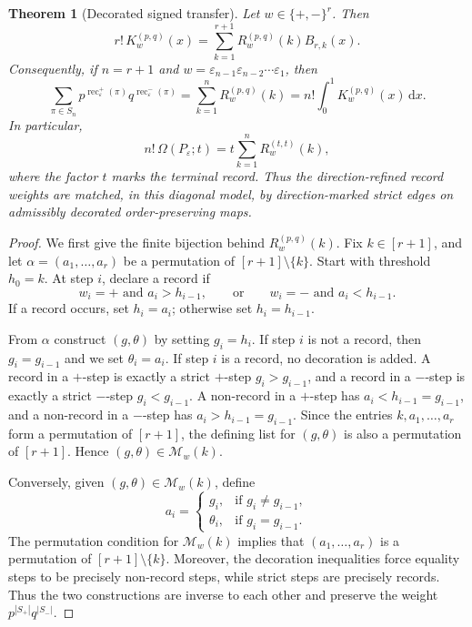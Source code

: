 \documentclass[11pt,letterpaper,reqno]{amsart}
\newtheorem{theorem}{Theorem}[section]
\theoremstyle{definition}
\DeclareMathOperator{\rec}{rec}
\newcommand{\dd}{\,\mathrm{d}}
\newcommand{\eps}{\varepsilon}
\begin{document}
\begin{theorem}[Decorated signed transfer]
\label{thm:decorated-signed-transfer}
Let \(w\in\{+,-\}^r\).  Then
\[
r!\,K_w^{(p,q)}(x)
=
\sum_{k=1}^{r+1}R_w^{(p,q)}(k)B_{r,k}(x).
\]
Consequently, if \(n=r+1\) and
\(w=\eps_{n-1}\eps_{n-2}\cdots\eps_1\), then
\[
\sum_{\pi\in S_n}
p^{\rec_\eps^+(\pi)}q^{\rec_\eps^-(\pi)}
=
\sum_{k=1}^{n}R_w^{(p,q)}(k)
=
n!\int_0^1K_w^{(p,q)}(x)\dd x.
\]
In particular,
\[
n!\,\Omega(P_\eps;t)
=
t\sum_{k=1}^{n}R_w^{(t,t)}(k),
\]
where the factor \(t\) marks the terminal record.  Thus the
direction-refined record weights are matched, in this diagonal model, by
direction-marked strict edges on admissibly decorated order-preserving maps.
\end{theorem}

\begin{proof}
We first give the finite bijection behind \(R_w^{(p,q)}(k)\).  Fix
\(k\in[r+1]\), and let $\alpha=(a_1,\ldots,a_r)$ be a permutation of \([r+1]\setminus\{k\}\).  Start with threshold
\(h_0=k\).  At step \(i\), declare a record if
\[
w_i=+\text{ and }a_i>h_{i-1},
\qquad\text{or}\qquad
w_i=-\text{ and }a_i<h_{i-1}.
\]
If a record occurs, set \(h_i=a_i\); otherwise set \(h_i=h_{i-1}\).

From \(\alpha\) construct \((g,\theta)\) by setting \(g_i=h_i\).  If step
\(i\) is not a record, then \(g_i=g_{i-1}\) and we set $\theta_i=a_i$. If step \(i\) is a record, no decoration is added.  A record in a \(+\)-step
is exactly a strict \(+\)-step \(g_i>g_{i-1}\), and a record in a \(-\)-step
is exactly a strict \(-\)-step \(g_i<g_{i-1}\).  A non-record in a \(+\)-step
has \(a_i<h_{i-1}=g_{i-1}\), and a non-record in a \(-\)-step has
\(a_i>h_{i-1}=g_{i-1}\).  Since the entries \(k,a_1,\ldots,a_r\) form a
permutation of \([r+1]\), the defining list for \((g,\theta)\) is also a
permutation of \([r+1]\).  Hence \((g,\theta)\in\mathcal M_w(k)\).

Conversely, given \((g,\theta)\in\mathcal M_w(k)\), define
\[
a_i=
\begin{cases}
g_i, & \text{if }g_i\ne g_{i-1},\\
\theta_i, & \text{if }g_i=g_{i-1}.
\end{cases}
\]
The permutation condition for \(\mathcal M_w(k)\) implies that
\((a_1,\ldots,a_r)\) is a permutation of \([r+1]\setminus\{k\}\).
Moreover, the decoration inequalities force equality steps to be precisely
non-record steps, while strict steps are precisely records.  Thus the two
constructions are inverse to each other and preserve the weight
\(p^{|S_+|}q^{|S_-|}\).


\end{proof}
\end{document}
